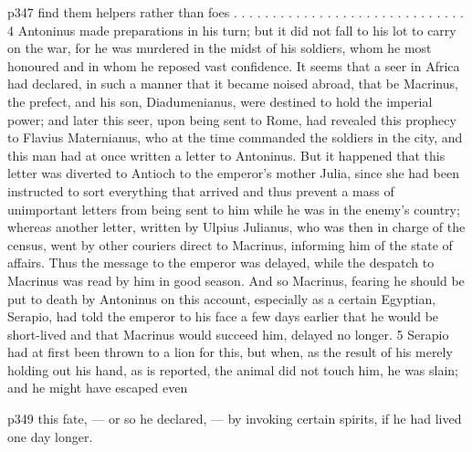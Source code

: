p347 find them helpers rather than foes . . . . . . . . . . . . . . . . . . . . . . . . . . . . . . 4
Antoninus made preparations in his turn; but it did not fall to his lot to carry on the war, for he was murdered in the midst of his soldiers, whom he most honoured and in whom he reposed vast confidence. It seems that a seer in Africa had declared, in such a manner that it became noised abroad, that be Macrinus, the prefect, and his son, Diadumenianus, were destined to hold the imperial power; and later this seer, upon being sent to Rome, had revealed this prophecy to Flavius Maternianus, who at the time commanded the soldiers in the city, and this man had at once written a letter to Antoninus. But it happened that this letter was diverted to Antioch to the emperor's mother Julia, since she had been instructed to sort everything that arrived and thus prevent a mass of unimportant letters from being sent to him while he was in the enemy's country; whereas another letter, written by Ulpius Julianus, who was then in charge of the census, went by other couriers direct to Macrinus, informing him of the state of affairs. Thus the message to the emperor was delayed, while the despatch to Macrinus was read by him in good season. And so Macrinus, fearing he should be put to death by Antoninus on this account, especially as a certain Egyptian, Serapio, had told the emperor to his face a few days earlier that he would be short-lived and that Macrinus would succeed him, delayed no longer. 5 Serapio had at first been thrown to a lion for this, but when, as the result of his merely holding out his hand, as is reported, the animal did not touch him, he was slain; and he might have escaped even

p349 this fate, \texthebrew{—} or so he declared, \texthebrew{—} by invoking certain spirits, if he had lived one day longer.

